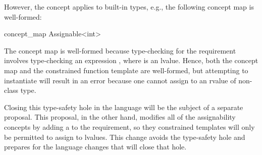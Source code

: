 \documentclass[american]{book}
\begin{document}
\begin{titlepage}
However, the  concept applies to built-in types,
e.g., the following concept map is well-formed:

\begin{codeblock}
concept_map Assignable<int> { }
\end{codeblock}

\noindent
The concept map is well-formed because type-checking for the
 requirement involves type-checking an expression
, where  is an lvalue. Hence, both the concept
map  and the constrained function template
 are well-formed, but attempting to instantiate
 will result in an error because one cannot assign to an
rvalue of non-class type.

Closing this type-safety hole in the language will be the subject of a
separate proposal. This proposal, in the other hand, modifies all of
the assignability concepts by adding a \tcode{\&}
 to the  requirement, so they
constrained templates will only be permitted to assign to
lvalues. This change avoids the type-safety hole and prepares for the
language changes that will close that hole.
\end{titlepage}

\pagestyle{fancy}
\fancyhead[LE,RO]{\textbf{\rightmark}}
\fancyhead[RE]{\textbf{\leftmark\hspace{1em}\thepage}}
\fancyhead[LO]{\textbf{\thepage\hspace{1em}\leftmark}}

\end{document}
